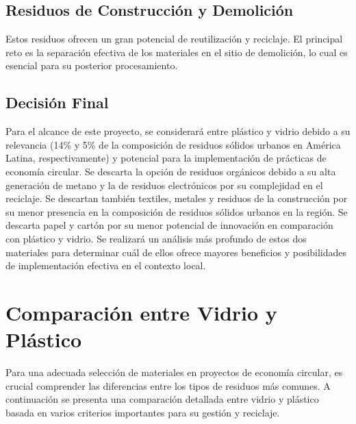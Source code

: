 \documentclass[main.tex]{subfiles}
\begin{document}
\subsection{Residuos de Construcción y Demolición}
Estos residuos ofrecen un gran potencial de reutilización y reciclaje. El principal reto es la separación efectiva de los materiales en el sitio de demolición, lo cual es esencial para su posterior procesamiento.

\subsection{Decisión Final}
Para el alcance de este proyecto, se considerará entre plástico y vidrio debido a su relevancia (14\% y 5\% de la composición de residuos sólidos urbanos en América Latina, respectivamente) y potencial para la implementación de prácticas de economía circular. Se descarta la opción de residuos orgánicos debido a su alta generación de metano y la de residuos electrónicos por su complejidad en el reciclaje. Se descartan también textiles, metales y residuos de la construcción por su menor presencia en la composición de residuos sólidos urbanos en la región. Se descarta papel y cartón por su menor potencial de innovación en comparación con plástico y vidrio.
Se realizará un análisis más profundo de estos dos materiales para determinar cuál de ellos ofrece mayores beneficios y posibilidades de implementación efectiva en el contexto local.

\section{Comparación entre Vidrio y Plástico}

Para una adecuada selección de materiales en proyectos de economía circular, es crucial comprender las diferencias entre los tipos de residuos más comunes. A continuación se presenta una comparación detallada entre vidrio y plástico basada en varios criterios importantes para su gestión y reciclaje.
\end{document}
